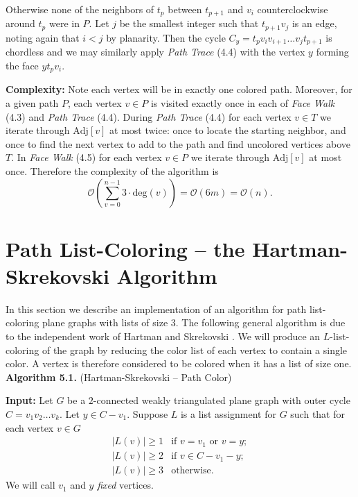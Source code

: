 \documentclass[letterpaper, 12pt]{article}
\theoremstyle{definition}
\theoremstyle{definition}
\theoremstyle{thm}
\theoremstyle{definition}
\begin{document}
Otherwise none of the neighbors of $t_p$ between $t_{p+1}$ and
$v_i$ counterclockwise around $t_p$ were in $P$. Let
$j$ be the smallest integer such that $t_{p+1}v_j$ is an edge, noting again
that $i<j$ by planarity. Then the cycle $C_y=t_pv_iv_{i+1}\ldots v_jt_{p+1}$ is
chordless and we may similarly apply \textit{Path Trace} (4.4) with the vertex
$y$ forming the face $yt_pv_i$.

\noindent\textbf{Complexity:} Note each vertex will be in exactly one colored
path. Moreover, for a given path $P$, each vertex $v\in P$ is visited exactly
once in each of \textit{Face Walk} (4.3) and \textit{Path Trace} (4.4).
During \textit{Path Trace} (4.4) for each vertex $v\in T$ we iterate through
$\text{Adj}[v]$ at most twice: once to locate the starting neighbor, and once
to find the next vertex to add to the path and find uncolored vertices above
$T$. In \textit{Face Walk} (4.5) for each vertex $v\in P$ we iterate through
$\text{Adj}[v]$ at most once. Therefore the complexity of the algorithm is
\[
    \mathcal{O}\left(\sum_{v=0}^{n-1}3\cdot\text{deg}(v)\right)
    =\mathcal{O}(6m)=\mathcal{O}(n).
\]



\section{Path List-Coloring -- the Hartman-Skrekovski Algorithm}

In this section we describe an implementation of an algorithm for path
list-coloring plane graphs with lists of size $3$. The following general
algorithm is due to the independent work of Hartman \cite{hartman} and
Skrekovski \cite{skrekovski}. We will produce an $L$-list-coloring of the graph
by reducing the color list of each vertex to contain a single color. A vertex is
therefore considered to be colored when it has a list of size one.\\

\noindent\textbf{Algorithm 5.1.} (Hartman-Skrekovski -- Path Color)

\noindent\textbf{Input:} Let $G$ be a $2$-connected weakly triangulated plane
graph with outer cycle $C=v_1v_2\ldots v_k$. Let $y\in C-v_1$.
Suppose $L$ is a list assignment for $G$ such that
for each vertex $v\in G$
\[
    \begin{array}{ll}
	    |L(v)|\ge 1 & \text{if } v=v_1 \text{ or } v=y;\\
	    |L(v)|\ge 2 & \text{if } v\in C-v_1-y;\\
	    |L(v)|\ge 3 & \text{otherwise.}
    \end{array}
\]
We will call $v_1$ and $y$ \textit{fixed} vertices.
\end{document}
